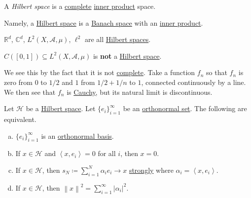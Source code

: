 \begin{definition}\label{def:Hilbert-space}
	A \emph{Hilbert space} is a \hyperref[def:complete]{complete} \hyperref[def:inner-product]{inner product} space.
\end{definition}
\begin{note}
	Namely, a \hyperref[def:Hilbert-space]{Hilbert space} is a \hyperref[def:Banach-space]{Banach space} with an \hyperref[def:inner-product]{inner product}.
\end{note}

\begin{eg}
	\(\mathbb{R}^d\), \(\mathbb{C}^d\), \(L^2(X,\mathcal{A},\mu)\), \(\ell^2\) are all \hyperref[def:Hilbert-space]{Hilbert spaces}.
\end{eg}

\begin{eg}
	\(C([0,1]) \subseteq L^2(X,\mathcal{A},\mu)\) is \textbf{not} a \hyperref[def:Hilbert-space]{Hilbert space}.
\end{eg}
\begin{explanation}
	We see this by the fact that it is not \hyperref[def:complete]{complete}. Take a function \(f_n\) so that \(f_n\) is zero from \(0\) to \(1/2\)
	and \(1\) from \(1/2 + 1/n\) to \(1\), connected continuously by a line. We then see that \(f_{n}\) is \hyperref[def:Cauchy-sequence]{Cauchy},
	but its natural limit is discontinuous.
\end{explanation}

\begin{theorem}\label{thm:lec-38}
	Let \(\mathcal{H}\) be a \hyperref[def:Hilbert-space]{Hilbert space}. Let \(\{e_i\}_{i=1}^\infty\) be an \hyperref[def:orthonormal-set]{orthonormal set}. The following are equivalent.
	\begin{enumerate}[(a)]
		\item\label{thm:lec-38-a} \(\{e_i\}_{i=1}^\infty\) is an \hyperref[def:orthonormal-basis]{orthonormal basis}.
		\item\label{thm:lec-38-b} If \(x \in \mathcal{H}\) and \(\left< x,e_i \right> = 0\) for all \(i\), then \(x = 0\).
		\item\label{thm:lec-38-c} If \(x \in \mathcal{H}\), then \(s_N \coloneqq \sum_{i=1}^N \alpha_i e_i \to x\) \hyperref[def:strong-convergence]{strongly} where \(\alpha_i = \left< x,e_i \right>\).
		\item\label{thm:lec-38-d} If \(x \in \mathcal{H}\), then \(\left\lVert x\right\rVert^2 = \sum_{i=1}^\infty \left\vert \alpha_i \right\vert ^2\).
	\end{enumerate}
\end{theorem}

